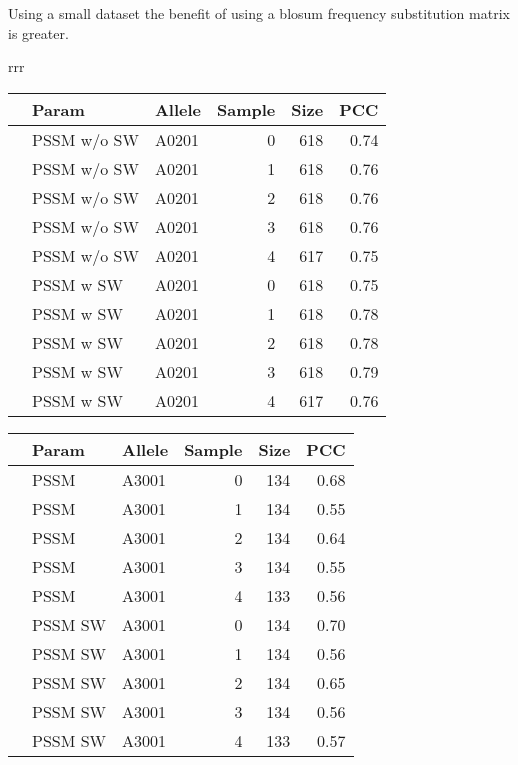 Using a small dataset the benefit of using a blosum frequency substitution matrix is greater.
\begin{table*}\scriptsize

\begin{center}

\begin{tabular}{rrr}

\begin{tabular}{rllrrr}
  \hline
 & Param & Allele & Sample & Size & PCC \\ 
  \hline
 & PSSM w/o SW & A0201 &   0 & 618 & 0.74 \\ 
 & PSSM w/o SW & A0201 &   1 & 618 & 0.76 \\ 
 & PSSM w/o SW & A0201 &   2 & 618 & 0.76 \\ 
 & PSSM w/o SW & A0201 &   3 & 618 & 0.76 \\ 
 & PSSM w/o SW & A0201 &   4 & 617 & 0.75 \\ 
\hline
 & PSSM w SW & A0201 &   0 & 618 & 0.75 \\ 
 & PSSM w SW & A0201 &   1 & 618 & 0.78 \\ 
 & PSSM w SW & A0201 &   2 & 618 & 0.78 \\ 
 & PSSM w SW & A0201 &   3 & 618 & 0.79 \\ 
 & PSSM w SW & A0201 &   4 & 617 & 0.76 \\ 
   \hline
\end{tabular}

\begin{tabular}{rllrrr}
  \hline
 & Param & Allele & Sample & Size & PCC \\ 
  \hline
   & PSSM & A3001 &   0 & 134 & 0.68 \\ 
   & PSSM & A3001 &   1 & 134 & 0.55 \\ 
   & PSSM & A3001 &   2 & 134 & 0.64 \\ 
   & PSSM & A3001 &   3 & 134 & 0.55 \\ 
   & PSSM & A3001 &   4 & 133 & 0.56 \\ 
  \hline
   & PSSM SW & A3001 &   0 & 134 & 0.70 \\ 
   & PSSM SW & A3001 &   1 & 134 & 0.56 \\ 
   & PSSM SW & A3001 &   2 & 134 & 0.65 \\ 
   & PSSM SW & A3001 &   3 & 134 & 0.56 \\ 
   & PSSM SW & A3001 &   4 & 133 & 0.57 \\ 
   \hline
\end{tabular}


\end{tabular}
\end{center}
\end{table*}
